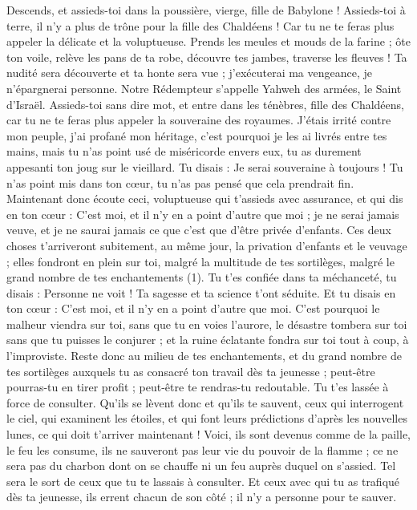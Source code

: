 \begin{multicols}{2}
\VerseOne{}Descends, et assieds-toi dans la poussière, vierge, fille de Babylone ! Assieds-toi à terre, il n'y a plus de trône pour la fille des Chaldéens ! Car tu ne te feras plus appeler la délicate et la voluptueuse.
Prends les meules et mouds de la farine ; ôte ton voile, relève les pans de ta robe, découvre tes jambes, traverse les fleuves !
Ta nudité sera découverte et ta honte sera vue ; j’exécuterai ma vengeance, je n’épargnerai personne.
Notre Rédempteur s’appelle Yahweh des armées, le Saint d'Israël.
Assieds-toi sans dire mot, et entre dans les ténèbres, fille des Chaldéens, car tu ne te feras plus appeler la souveraine des royaumes.
J’étais irrité contre mon peuple, j'ai profané mon héritage, c'est pourquoi je les ai livrés entre tes mains, mais tu n'as point usé de miséricorde envers eux, tu as durement appesanti ton joug sur le vieillard.
Tu disais : Je serai souveraine à toujours ! Tu n'as point mis dans ton cœur, tu n’as pas pensé que cela prendrait fin.
Maintenant donc écoute ceci, voluptueuse qui t’assieds avec assurance, et qui dis en ton cœur : C'est moi, et il n'y en a point d'autre que moi ; je ne serai jamais veuve, et je ne saurai jamais ce que c'est que d'être privée d'enfants.
Ces deux choses t'arriveront subitement, au même jour, la privation d'enfants et le veuvage ; elles fondront en plein sur toi, malgré la multitude de tes sortilèges, malgré le grand nombre de tes enchantements (1).
Tu t'es confiée dans ta méchanceté, tu disais : Personne ne voit ! Ta sagesse et ta science t’ont séduite. Et tu disais en ton cœur : C'est moi, et il n'y en a point d'autre que moi.
C'est pourquoi le malheur viendra sur toi, sans que tu en voies l’aurore, le désastre tombera sur toi sans que tu puisses le conjurer ; et la ruine éclatante fondra sur toi tout à coup, à l’improviste.
Reste donc au milieu de tes enchantements, et du grand nombre de tes sortilèges auxquels tu as consacré ton travail dès ta jeunesse ; peut-être pourras-tu en tirer profit ; peut-être te rendras-tu redoutable.
Tu t'es lassée à force de consulter. Qu’ils se lèvent donc et qu’ils te sauvent, ceux qui interrogent le ciel, qui examinent les étoiles, et qui font leurs prédictions d’après les nouvelles lunes, ce qui doit t’arriver maintenant !
Voici, ils sont devenus comme de la paille, le feu les consume, ils ne sauveront pas leur vie du pouvoir de la flamme ; ce ne sera pas du charbon dont on se chauffe ni un feu auprès duquel on s’assied.
Tel sera le sort de ceux que tu te lassais à consulter. Et ceux avec qui tu as trafiqué dès ta jeunesse, ils errent chacun de son côté ; il n'y a personne pour te sauver.

\end{multicols}
